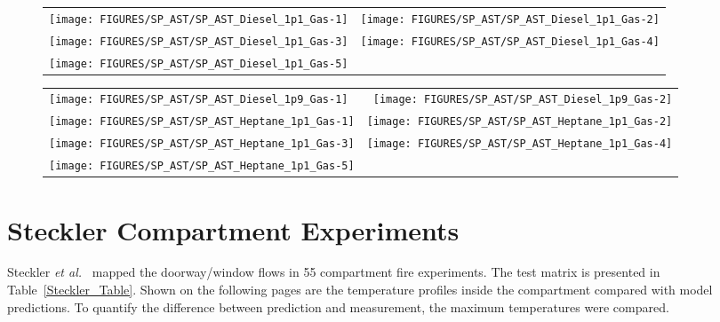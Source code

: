 \begin{figure}[h!]
\begin{tabular*}{\textwidth}{l@{\extracolsep{\fill}}r}
\texttt{[image: FIGURES/SP\_AST/SP\_AST\_Diesel\_1p1\_Gas-1]}   &  \texttt{[image: FIGURES/SP\_AST/SP\_AST\_Diesel\_1p1\_Gas-2]}    \\
\texttt{[image: FIGURES/SP\_AST/SP\_AST\_Diesel\_1p1\_Gas-3]}   &  \texttt{[image: FIGURES/SP\_AST/SP\_AST\_Diesel\_1p1\_Gas-4]}     \\
\texttt{[image: FIGURES/SP\_AST/SP\_AST\_Diesel\_1p1\_Gas-5]}   &
\end{tabular*}
\label{SP_Diesel_1p1_Gas}
\end{figure}

\newpage

\begin{figure}[p]
\begin{tabular*}{\textwidth}{l@{\extracolsep{\fill}}r}
\texttt{[image: FIGURES/SP\_AST/SP\_AST\_Diesel\_1p9\_Gas-1]}   &  \texttt{[image: FIGURES/SP\_AST/SP\_AST\_Diesel\_1p9\_Gas-2]}    \\
\texttt{[image: FIGURES/SP\_AST/SP\_AST\_Heptane\_1p1\_Gas-1]}  &  \texttt{[image: FIGURES/SP\_AST/SP\_AST\_Heptane\_1p1\_Gas-2]}    \\
\texttt{[image: FIGURES/SP\_AST/SP\_AST\_Heptane\_1p1\_Gas-3]}  &  \texttt{[image: FIGURES/SP\_AST/SP\_AST\_Heptane\_1p1\_Gas-4]}     \\
\texttt{[image: FIGURES/SP\_AST/SP\_AST\_Heptane\_1p1\_Gas-5]}  &
\end{tabular*}
\label{SP_Diesel_1p9_Gas}
\end{figure}

\clearpage

\section{Steckler Compartment Experiments}

Steckler {\em et al.}~\cite{Steckler:1982} mapped the doorway/window flows in 55 compartment fire experiments. The test matrix is presented in Table~\ref{Steckler_Table}. Shown on the following pages are the temperature profiles inside the compartment compared with model predictions. To quantify the difference between prediction and measurement, the maximum temperatures were compared.



